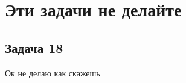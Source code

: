 \documentclass[a4paper]{article}
\begin{document}

    
    \section*{Эти задачи не делайте}

    \subsection*{Задача 18}
    Ок не делаю как скажешь












\end{document}
